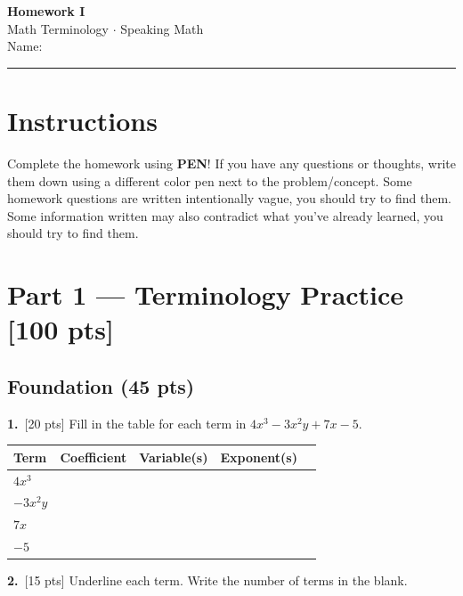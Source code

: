 \documentclass[12pt]{article}
\begin{document}
\pagestyle{fancy}

\begin{center}
  {\Large\bfseries Homework I}\\[4pt]
  Math Terminology $\cdot$ Speaking Math\\[6pt]
  Name:\;\underline{\hspace{6.5cm}}\quad
\end{center}
\hrule\bigskip

\section*{Instructions}
Complete the homework using \textbf{PEN}! If you have any questions or thoughts, write them down using a different color pen next to the problem/concept. Some homework questions are written intentionally vague, you should try to find them. Some information written may also contradict what you've already learned, you should try to find them. 

\section*{Part 1 --- Terminology Practice \hfill [100 pts]}

\subsection*{Foundation (45 pts)}

\textbf{1.}~[20 pts]\quad
Fill in the table for each term in $4x^3 - 3x^2y + 7x - 5$.

\medskip
\begin{center}
\renewcommand{\arraystretch}{2.2}
\begin{tabular}{|C{1.4cm}|C{2.3cm}|C{2.3cm}|C{2.5cm}|C{2.2cm}|}
\hline
\textbf{Term} & \textbf{Coefficient} & \textbf{Variable(s)}
              & \textbf{Exponent(s)} \\
\hline
$4x^3$   & & &  \\ \hline
$-3x^2y$ & & &  \\ \hline
$7x$     & & &  \\ \hline
$-5$     & & &  \\ \hline
\end{tabular}
\renewcommand{\arraystretch}{1}
\end{center}

\bigskip
\textbf{2.}~[15 pts]\quad
Underline each term. Write the number of terms in the blank.
\end{document}
